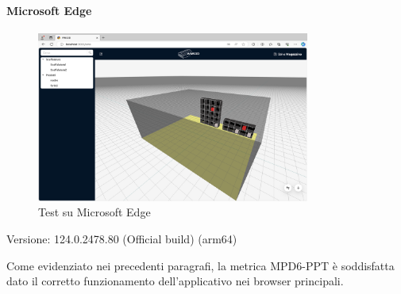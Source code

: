 \paragraph{Microsoft Edge}
\begin{figure}[h!] 
    \centering
    \includegraphics[width=0.8\textwidth]{images/microsoftedge.png}
    \caption{Test su Microsoft Edge}
\end{figure}
Versione: 124.0.2478.80 (Official build) (arm64)

\vspace{3cm}
\noindent
Come evidenziato nei precedenti paragrafi, la metrica MPD6-PPT è soddisfatta dato il corretto funzionamento dell'applicativo nei browser principali. 

\newpage
